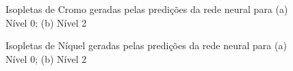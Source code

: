 \documentclass[brazil,tf,epusp]{usp}  %
\begin{document}
\begin{figure}
\caption{Isopletas de Cromo geradas pelas predições da rede neural para (a) Nível 0; (b) Nível 2 }
\label{fig:Cr_NN_isop}
\end{figure}

\begin{figure}
\caption{Isopletas de Níquel geradas pelas predições da rede neural para (a) Nível 0; (b) Nível 2 }
\label{fig:Ni_NN_isop}
\end{figure}
\end{document}
